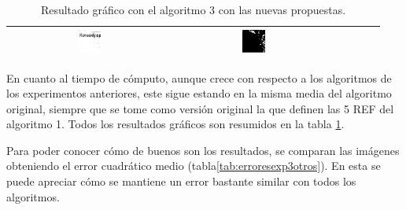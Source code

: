 \documentclass[main]{subfiles}
\begin{document}
\begin{table}
\begin{tabular}{cccccc}
\includegraphics[width=0.15\textwidth]{img/res/e3a/alg3ctipo-09.jpg} &
\includegraphics[width=0.15\textwidth]{img/res/e3a/alg3ctipo-07.jpg}\\\hline
\end{tabular}
\caption{Resultado gráfico con el algoritmo 3 con las nuevas propuestas.\label{tab:resultexp3imagenesdombi}}
\end{table}

En cuanto al tiempo de cómputo, aunque crece con respecto a los algoritmos de los experimentos anteriores, este sigue estando en la misma media del algoritmo original, siempre que se tome como versión original la que definen las 5 REF del algoritmo 1. Todos los resultados gráficos son resumidos en la tabla \ref{tab:resultexp3imagenesdombi}.


Para poder conocer cómo de buenos son los resultados, se comparan las imágenes obteniendo el error cuadrático medio (tabla\ref{tab:erroresexp3otros}). En esta se puede apreciar cómo se mantiene un error bastante similar con todos los algoritmos.

\end{document}
